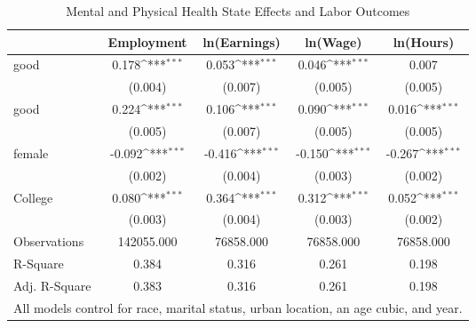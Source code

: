 \def\sym#1{\ifmmode^{#1}\else\(^{#1}\)\fi}
\begin{table}
\center\caption{Mental and Physical Health State Effects and Labor Outcomes}
\footnotesize
\begin{tabular}{l*{4}{c}}
                    &\multicolumn{1}{c}{Employment}&\multicolumn{1}{c}{ln(Earnings)}&\multicolumn{1}{c}{ln(Wage)}&\multicolumn{1}{c}{ln(Hours)}\\
\midrule
good                &       0.178\sym{***}&       0.053\sym{***}&       0.046\sym{***}&       0.007         \\
                    &     (0.004)         &     (0.007)         &     (0.005)         &     (0.005)         \\
good                &       0.224\sym{***}&       0.106\sym{***}&       0.090\sym{***}&       0.016\sym{***}\\
                    &     (0.005)         &     (0.007)         &     (0.005)         &     (0.005)         \\
female              &      -0.092\sym{***}&      -0.416\sym{***}&      -0.150\sym{***}&      -0.267\sym{***}\\
                    &     (0.002)         &     (0.004)         &     (0.003)         &     (0.002)         \\
College             &       0.080\sym{***}&       0.364\sym{***}&       0.312\sym{***}&       0.052\sym{***}\\
                    &     (0.003)         &     (0.004)         &     (0.003)         &     (0.002)         \\
\midrule
Observations        &  142055.000         &   76858.000         &   76858.000         &   76858.000         \\
R-Square            &       0.384         &       0.316         &       0.261         &       0.198         \\
Adj. R-Square       &       0.383         &       0.316         &       0.261         &       0.198         \\
\hline
\multicolumn{5}{l}{\small{All models control for race, marital status, urban location, an age cubic, and year.}} \\
\end{tabular}
\end{table}
